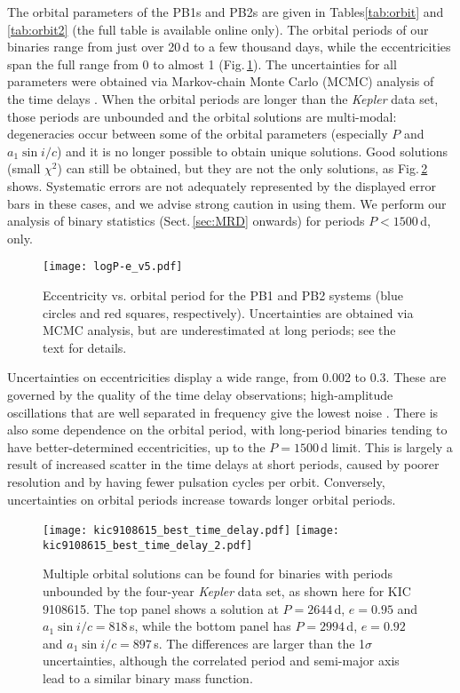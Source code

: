 \documentclass[a4paper,fleqn,usenatbib]{mnras}
\begin{document}
The orbital parameters of the PB1s and PB2s are given in Tables\:\ref{tab:orbit} and \ref{tab:orbit2} (the full table is available online only). 
The orbital periods of our binaries range from just over 20\,d to a few thousand days, while the eccentricities span the full range from 0 to almost 1 (Fig.\,\ref{fig:pb_orbits}). The uncertainties for all parameters were obtained via Markov-chain Monte Carlo (MCMC) analysis of the time delays \citep{murphyetal2016b}. When the orbital periods are longer than the \textit{Kepler} data set, those periods are unbounded and the orbital solutions are multi-modal: degeneracies occur between some of the orbital parameters (especially $P$ and $a_1 \sin i / c$) and it is no longer possible to obtain unique solutions. Good solutions (small $\chi^2$) can still be obtained, but they are not the only solutions, as Fig.\,\ref{fig:longp} shows. Systematic errors are not adequately represented by the displayed error bars in these cases, and we advise strong caution in using them. We perform our analysis of binary statistics (Sect.\,\ref{sec:MRD} onwards) for periods $P<1500$\,d, only.


\begin{figure}
\begin{center}
\texttt{[image: logP-e\_v5.pdf]}
\caption{Eccentricity vs. orbital period for the PB1 and PB2 systems (blue circles and red squares, respectively). Uncertainties are obtained via MCMC analysis, but are underestimated at long periods; see the text for details.}
\label{fig:pb_orbits}
\end{center}
\end{figure}


Uncertainties on eccentricities display a wide range, from 0.002 to 0.3. These are governed by the quality of the time delay observations; high-amplitude oscillations that are well separated in frequency give the lowest noise \citep{murphyetal2016b}. There is also some dependence on the orbital period, with long-period binaries tending to have better-determined eccentricities, up to the $P=1500$\,d limit. This is largely a result of increased scatter in the time delays at short periods, caused by poorer resolution and by having fewer pulsation cycles per orbit. Conversely, uncertainties on orbital periods increase towards longer orbital periods.

\begin{figure}
\begin{center}
\texttt{[image: kic9108615\_best\_time\_delay.pdf]}
\texttt{[image: kic9108615\_best\_time\_delay\_2.pdf]}
\caption{Multiple orbital solutions can be found for binaries with periods unbounded by the four-year \textit{Kepler} data set, as shown here for KIC\,9108615. The top panel shows a solution at $P = 2644$\,d, $e = 0.95$ and $a_1 \sin i / c = 818$\,s, while the bottom panel has $P = 2994$\,d, $e = 0.92$ and $a_1 \sin i / c = 897$\,s. The differences are larger than the 1$\sigma$ uncertainties, although the correlated period and semi-major axis lead to a similar binary mass function.}
\label{fig:longp}
\end{center}
\end{figure}
\end{document}
